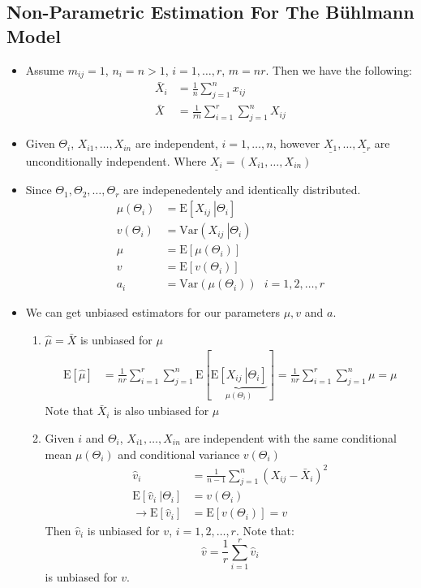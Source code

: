 \documentclass[english,12pt]{article}
\theoremstyle{plain}
\theoremstyle{definition}
\theoremstyle{definition} %
\newcommand{\enum}[1]{\begin{enumerate} #1 \end{enumerate}}
\newcommand{\ex}[1]{\mbox{E} \left[ #1 \right]}
\newcommand{\var}[1]{\mbox{Var} \left( #1 \right)}
\newcommand{\condex}[2]{\mbox{E} \left[ \left. #1 \ \right\vert \left. #2 \right. \right]}
\newcommand{\condvar}[2]{\mbox{Var} \left( \left. #1 \ \right\lvert \left. #2 \right. \right)}
\begin{document}
\subsection{Non-Parametric Estimation For The B\"{u}hlmann Model}
\begin{itemize}
\item Assume $m_{ij}=1$, $n_i=n>1$, $i=1,\ldots,r$, $m=nr$.  Then we have the following:
\begin{align*}
\bar{X}_i&=\frac{1}{n}\sum_{j=1}^nx_{ij}\\
\bar{X}&=\frac{1}{rn}\sum_{i=1}^r\sum_{j=1}^nX_{ij}
\end{align*}

\item Given $\Theta_i$, $X_{i1},\ldots,X_{in}$ are independent, $i=1,\ldots,n$, however $\underline{X_1},\ldots,\underline{X_r}$ are unconditionally independent.  Where $\underline{X_i}=(X_{i1},\ldots,X_{in})$

\item Since $\Theta_1, \Theta_2,\ldots, \Theta_r$ are indepenedentely and identically distributed.
\begin{align*}
\mu(\Theta_i)&=\condex{X_{ij}}{\Theta_i}\\
v(\Theta_i)&=\condvar{X_{ij}}{\Theta_i}\\
\mu&=\ex{\mu(\Theta_i)}\\
v&=\ex{v(\Theta_i)}\\
a_i&=\var{\mu(\Theta_i)}\text{ }i=1,2,\ldots,r
\end{align*}

\item We can get unbiased estimators for our parameters $\mu,v$ and $a$.
\enum{
\item $\hat\mu=\bar{X}$ is unbiased for $\mu$
\begin{align*}
\ex{\hat\mu}&=\frac{1}{nr}\sum_{i=1}^r\sum_{j=1}^n\ex{\underbrace{\condex{X_{ij}}{\Theta_i}}_{\mu(\Theta_i)}}
=\frac{1}{nr}\sum_{i=1}^r\sum_{j=1}^n\mu
=\mu
\end{align*}
Note that $\bar{X}_i$ is also unbiased for $\mu$

\item Given $i$ and $\Theta_i$, $X_{i1},\ldots, X_{in}$ are independent with the same conditional mean $\mu(\Theta_i)$ and conditional variance $v(\Theta_i)$
\begin{align*}
\hat{v}_i&=\frac{1}{n-1}\sum_{j=1}^n(X_{ij}-\bar{X}_i)^2\\
\condex{\hat{v}_i}{\Theta_i}&=v(\Theta_i)\\
\rightarrow \ex{\hat{v}_i}&=\ex{v(\Theta_i)}
=v
\end{align*}
Then $\hat{v}_i$ is unbiased for $v$, $i=1,2,\ldots, r$.  Note that:
\[\hat{v}=\frac{1}{r}\sum_{i=1}^r\hat{v}_i\]
is unbiased for $v$.
}
\end{itemize}
\end{document}
